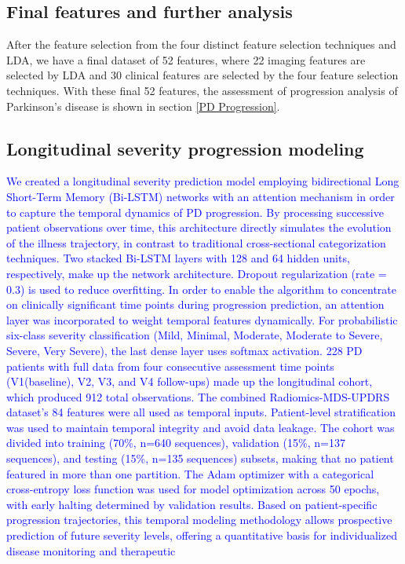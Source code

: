 \documentclass[twocolumn]{article}
\begin{document}
\subsection{Final features and further analysis}
After the feature selection from the four distinct feature selection techniques and LDA, we have a final dataset of 52 features, where 22 imaging features are selected by LDA and 30 clinical features are selected by the four feature selection techniques. With these final 52 features, the assessment of progression analysis of Parkinson's disease is shown in section \ref{PD Progression}.

\subsection{Longitudinal severity progression modeling}
\label{sec:longitudinal_model}

\textcolor{blue}{We created a longitudinal severity prediction model employing bidirectional Long Short-Term Memory (Bi-LSTM) networks with an attention mechanism in order to capture the temporal dynamics of PD progression.  By processing successive patient observations over time, this architecture directly simulates the evolution of the illness trajectory, in contrast to traditional cross-sectional categorization techniques.  Two stacked Bi-LSTM layers with 128 and 64 hidden units, respectively, make up the network architecture. Dropout regularization (rate = 0.3) is used to reduce overfitting.  In order to enable the algorithm to concentrate on clinically significant time points during progression prediction, an attention layer was incorporated to weight temporal features dynamically.  For probabilistic six-class severity classification (Mild, Minimal, Moderate, Moderate to Severe, Severe, Very Severe), the last dense layer uses softmax activation.
228 PD patients with full data from four consecutive assessment time points (V1(baseline), V2, V3, and V4 follow-ups) made up the longitudinal cohort, which produced 912 total observations.  The combined Radiomics-MDS-UPDRS dataset's 84 features were all used as temporal inputs.  Patient-level stratification was used to maintain temporal integrity and avoid data leakage. The cohort was divided into training (70\%, n=640 sequences), validation (15\%, n=137 sequences), and testing (15\%, n=135 sequences) subsets, making that no patient featured in more than one partition.  The Adam optimizer with a categorical cross-entropy loss function was used for model optimization across 50 epochs, with early halting determined by validation results.  Based on patient-specific progression trajectories, this temporal modeling methodology allows prospective prediction of future severity levels, offering a quantitative basis for individualized disease monitoring and therapeutic}
\end{document}

